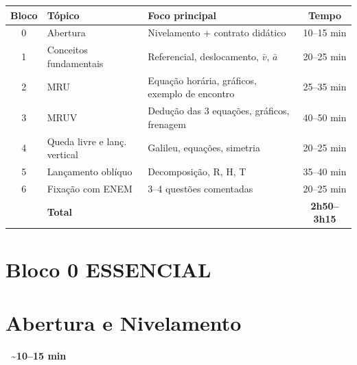 \documentclass[12pt,a4paper]{article}
\newcommand{\tempo}[1]{%
  \begin{flushright}
    \colorbox{azulphysics!20}{\small\textbf{\faClock\ \textasciitilde{}#1 min}}
  \end{flushright}\vspace{-0.5em}
}
\begin{document}
\vspace{0.8em}

\begin{tcolorbox}[colback=white, colframe=azulphysics!40, arc=2mm,
  fonttitle=\bfseries, title={Cronograma Resumido}]

\renewcommand{\arraystretch}{1.5}
\begin{tabularx}{\linewidth}{clXc}
  \toprule
  \textbf{Bloco} & \textbf{T\'opico} & \textbf{Foco principal} & \textbf{Tempo} \\
  \midrule
  0 & Abertura & Nivelamento + contrato did\'atico
    & 10--15 min \\
  1 & Conceitos fundamentais & Referencial, deslocamento, $\bar{v}$, $\bar{a}$
    & 20--25 min \\
  2 & MRU & Equa\c{c}\~ao hor\'aria, gr\'aficos, exemplo de encontro
    & 25--35 min \\
  3 & MRUV & Dedu\c{c}\~ao das 3 equa\c{c}\~oes, gr\'aficos, frenagem
    & 40--50 min \\
  4 & Queda livre e lan\c{c}. vertical & Galileu, equa\c{c}\~oes, simetria
    & 20--25 min \\
  5 & Lan\c{c}amento obl\'iquo & Decomposi\c{c}\~ao, R, H, T
    & 35--40 min \\
  6 & Fixação com ENEM & 3--4 quest\~oes comentadas
    & 20--25 min \\
  \midrule
  & \textbf{Total} & & \textbf{2h50--3h15} \\
  \bottomrule
\end{tabularx}
\end{tcolorbox}

\newpage
\tableofcontents
\newpage

\section*{Bloco 0 \hfill\colorbox{verdeok!30}{\small ESSENCIAL}}
\section*{\hspace{1.2em}Abertura e Nivelamento}
\tempo{10--15}
\end{document}
